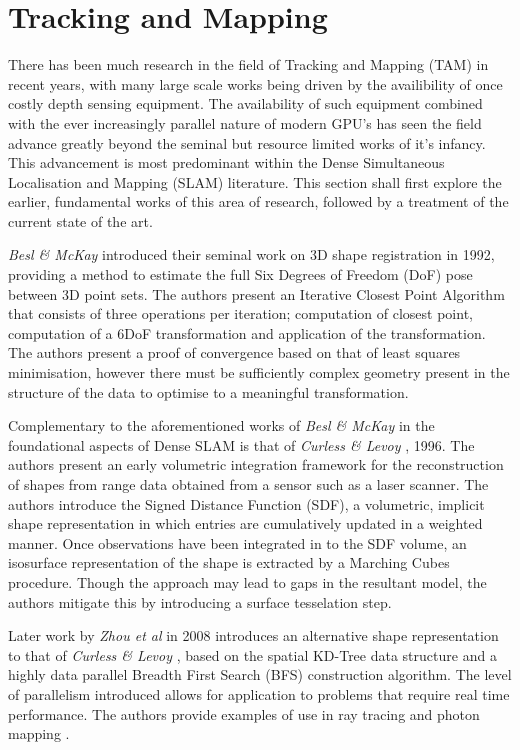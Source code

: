 
\section{Tracking and Mapping}
\label{sec:lit_review_tam}
There has been much research in the field of Tracking and Mapping (TAM) in recent 
years, with many large scale works being driven by the availibility of once 
costly depth sensing equipment. The availability of such equipment combined 
with the ever increasingly parallel nature of modern GPU's has seen the 
field advance greatly beyond the seminal but resource limited works of it's 
infancy. This advancement is most predominant within the Dense Simultaneous 
Localisation and Mapping (SLAM) literature. This section shall first explore the 
earlier, fundamental works of this area of research, followed by a treatment 
of the current state of the art.

\textit{Besl \& McKay} \cite{Besl1992} introduced their seminal work on 3D shape 
registration in 1992, providing a method to estimate the full Six Degrees of 
Freedom (DoF) pose between 3D point sets. The authors present an Iterative Closest 
Point Algorithm that consists of three operations per iteration; computation 
of closest point, computation of a 6DoF transformation and application of 
the transformation. The authors present a proof of convergence based on that 
of least squares minimisation, however there must be sufficiently complex 
geometry present in the structure of the data to optimise to a meaningful 
transformation.

Complementary to the aforementioned works of \textit{Besl \& McKay} \cite{Besl1992} 
in the foundational aspects of Dense SLAM is that of \textit{Curless \& Levoy} 
\cite{Curless1996}, 1996. The authors present an early volumetric integration 
framework for the reconstruction of shapes from range data obtained from a 
sensor such as a laser scanner. The authors introduce the Signed Distance Function (SDF), 
a volumetric, implicit shape representation in which entries are cumulatively updated 
in a weighted manner. Once observations have been integrated in to the SDF volume, an 
isosurface representation of the shape is extracted by a Marching Cubes \cite{MC} 
procedure. Though the approach may lead to gaps in the resultant model, the authors 
mitigate this by introducing a surface tesselation step.

Later work by \textit{Zhou et al} \cite{Zhou2008} in 2008 introduces an alternative 
shape representation to that of \textit{Curless \& Levoy} \cite{Curless1996}, based 
on the spatial KD-Tree data structure and a highly data parallel Breadth First 
Search (BFS) construction algorithm. The level of parallelism introduced allows for 
application to problems that require real time performance. The authors provide 
examples of use in ray tracing \cite{RT} and photon mapping \cite{PM}.

